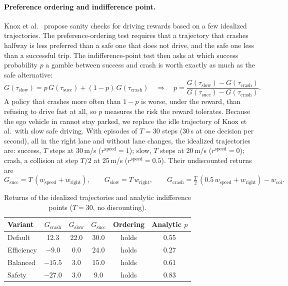 \paragraph{Preference ordering and indifference point.}
Knox et al.~\cite{knox2023reward} propose sanity checks for driving rewards based on a few idealized trajectories.
The preference-ordering test requires that a trajectory that crashes halfway is less preferred than a safe one that
does not drive, and the safe one less than a successful trip. The indifference-point test then asks at which success
probability $p$ a gamble between success and crash is worth exactly as much as the safe alternative:
\begin{equation}
  G(\tau_{\mathrm{slow}}) = p\, G(\tau_{\mathrm{succ}}) + (1-p)\, G(\tau_{\mathrm{crash}})
  \quad\Longrightarrow\quad
  p = \frac{G(\tau_{\mathrm{slow}}) - G(\tau_{\mathrm{crash}})}{G(\tau_{\mathrm{succ}}) - G(\tau_{\mathrm{crash}})}.
  \label{eq:indifference}
\end{equation}
A policy that crashes more often than $1-p$ is worse, under the reward, than refusing to drive fast at all, so $p$
measures the risk the reward tolerates. Because the ego vehicle in  cannot stay parked, we replace
the idle trajectory of Knox et al.\ with slow safe driving. With episodes of $T = 30$ steps (30\,s at one decision per
second), all in the right lane and without lane changes, the idealized trajectories are: success, $T$ steps at
30\,m/s ($r^{\mathrm{speed}} = 1$); slow, $T$ steps at 20\,m/s ($r^{\mathrm{speed}} = 0$); crash, a collision at step
$T/2$ at 25\,m/s ($r^{\mathrm{speed}} = 0.5$). Their undiscounted returns are
\begin{equation}
  G_{\mathrm{succ}} = T\,(w_{\mathrm{speed}} + w_{\mathrm{right}}), \qquad
  G_{\mathrm{slow}} = T\, w_{\mathrm{right}}, \qquad
  G_{\mathrm{crash}} = \tfrac{T}{2}\,(0.5\, w_{\mathrm{speed}} + w_{\mathrm{right}}) - w_{\mathrm{col}}.
  \label{eq:idealized-returns}
\end{equation}

\begin{table}[H]
  \centering
  \small
  \caption{Returns of the idealized trajectories and analytic indifference points ($T = 30$, no discounting).}
  \label{tab:reward-analytic}
  \begin{tabular}{@{}lccccc@{}}
    \toprule
    Variant & $G_{\mathrm{crash}}$ & $G_{\mathrm{slow}}$ & $G_{\mathrm{succ}}$ & Ordering & Analytic $p$ \\
    \midrule
    Default    & 12.3    & 22.0 & 30.0 & holds & 0.55 \\
    Efficiency & $-9.0$  & 0.0 & 24.0 & holds & 0.27 \\
    Balanced   & $-15.5$ & 3.0 & 15.0 & holds & 0.61 \\
    Safety     & $-27.0$ & 3.0 & 9.0  & holds & 0.83 \\
    \bottomrule
  \end{tabular}
\end{table}

